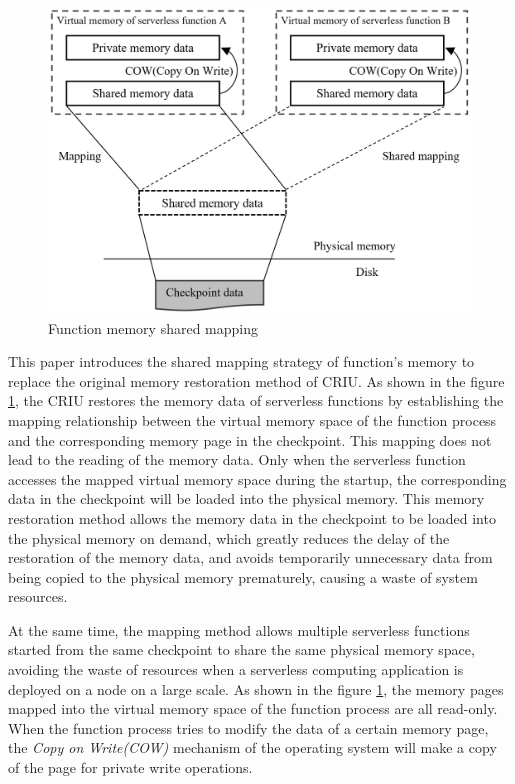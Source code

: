 \begin{figure}[t]
    \centering
    \includegraphics[width=\linewidth]{images/shared-memory.PNG}
    \caption{Function memory shared mapping}
    \label{shared-mapping}
\end{figure}

This paper introduces the shared mapping strategy 
of function's memory to replace the original memory restoration method of CRIU. 
As shown in the figure \ref{shared-mapping}, 
the CRIU restores the memory data of serverless functions by 
establishing the mapping relationship between the virtual memory space 
of the function process and the corresponding memory page in the checkpoint. 
This mapping does not lead to the reading of the memory data. 
Only when the serverless function accesses the mapped virtual memory space during the startup, 
the corresponding data in the checkpoint will be loaded into the physical memory.
This memory restoration method allows the memory data in the checkpoint to be loaded into the physical memory on demand, which greatly reduces the delay of the restoration of the memory data, and avoids temporarily unnecessary data from being copied to the physical memory prematurely, 
causing a waste of system resources.

At the same time, 
the mapping method allows multiple serverless 
functions started from the same checkpoint to share the same physical memory space, 
avoiding the waste of resources when a serverless computing application is deployed on a node on a large scale. 
As shown in the figure \ref{shared-mapping}, 
the memory pages mapped into the virtual memory space of the function process are all read-only. 
When the function process tries to modify the data of a certain memory page, 
the \textit{Copy on Write(COW)} mechanism of the operating system  
will make a copy of the page for private write operations.